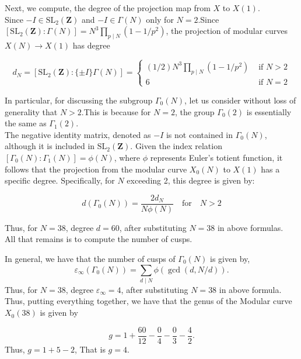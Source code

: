 Next, we compute, the degree of the projection map from $X$ to $X(1)$.  \\

Since $-I \in \mathrm{SL}_{2}(\mathbf{Z})$ and $-I \in \Gamma(N)$ only for $N=2$.Since $\left[\mathrm{SL}_{2}(\mathbf{Z}): \Gamma(N)\right]=N^{3} \prod_{p \mid N}\left(1-1 / p^{2}\right)$, the projection of modular curves $X(N) \longrightarrow X(1)$ has degree

$$
d_{N}=\left[\mathrm{SL}_{2}(\mathbf{Z}):\{ \pm I\} \Gamma(N)\right]= \begin{cases}(1 / 2) N^{3} \prod_{p \mid N}\left(1-1 / p^{2}\right) & \text { if } N>2 \\ 6 & \text { if } N=2\end{cases}
$$


In particular, for discussing the subgroup \( \Gamma_{0}(N) \), let us consider without loss of generality that $N>2$.This is because for \( N = 2 \), the group \( \Gamma_{0}(2) \) is essentially the same as \( \Gamma_{1}(2) \). \\
The negative identity matrix, denoted as \( -I \) is not contained in \( \Gamma_{0}(N) \), although it is included in \( \mathrm{SL}_{2}(\mathbf{Z}) \). Given the index relation \( [\Gamma_{0}(N): \Gamma_{1}(N)] = \phi(N) \), where \( \phi \) represents Euler's totient function, it follows that the projection from the modular curve \( X_{0}(N) \) to \( X(1) \) has a specific degree. Specifically, for \( N \) exceeding 2, this degree is given by:

\[
d(\Gamma_{0}(N)) = \frac{2d_{N}}{N \phi(N)} \quad \text{for} \quad N > 2
\]

Thus, for $N=38$, degree $d=60$, after substituting $N=38$ in above formulas.\\

All that remains is to compute the number of cusps.

In general, we have that the number of cusps of $\Gamma_{0}(N)$ is
given by, 
$$
\varepsilon_{\infty}\left(\Gamma_{0}(N)\right)=\sum_{d \mid N} \phi(\operatorname{gcd}(d, N / d)).
$$
Thus, for $N=38$, degree $\varepsilon_\infty=4$, after substituting $N=38$ in above formula.\\

Thus, putting everything together, we have that the genus of the Modular curve $X_0(38)$ is given by

\[
g = 1 + \frac{60}{12} - \frac{0}{4} - \frac{0}{3} - \frac{4}{2}.
\]
Thus, $g=1+5-2$, That is $g=4.$

